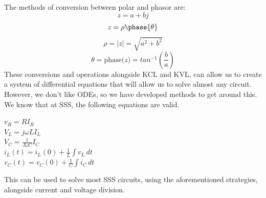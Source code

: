 \documentclass[nobib]{tufte-handout}
\begin{document}
The methods of conversion between polar and phasor are:\\
\begin{equation*}
    z=a+bj
\end{equation*}
\begin{equation*}
    z=\rho \phase{\theta}
\end{equation*}
\begin{equation*}
    \rho = |z| = \sqrt{a^2 + b^2}
\end{equation*}
\begin{equation*}
    \theta = \text{phase(}z\text{)}=tan^{-1}(\frac{b}{a})
\end{equation*}
These conversions and operations alongside KCL and KVL, can allow us to create a system of differential equations that will allow us to solve almost any circuit. However, we don't like ODEs, so we have developed methods to get around this.\\
We know that at SSS, the following equations are valid.\\
\begin{center}
    $v_R = RI_R$\\
    $V_L = j\omega LI_L$\\
    $V_C = \frac{1}{J \omega C}I_C$\\
    $i_L(t) = i_L(0) + \frac{1}{L} \int v_L \,dt$\\
    $v_C(t) = v_C(0) + \frac{1}{C} \int i_C \,dt$\\
\end{center}
This can be used to solve most SSS circuits, using the aforementioned strategies, alongside current and voltage division.
\pagebreak
\end{document}
